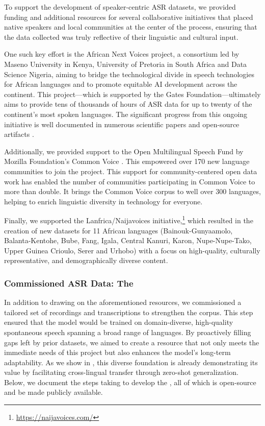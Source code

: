 \documentclass[]{fairmeta}
\begin{document}
To support the development of speaker-centric ASR datasets, we provided funding and additional resources for several collaborative initiatives that placed native speakers and local communities at the center of the process, ensuring that the data collected was truly reflective of their linguistic and cultural input.

One such key effort is the African Next Voices project, a consortium led by Maseno University in Kenya, University of Pretoria in South Africa and Data Science Nigeria, aiming to bridge the technological divide in speech technologies for African languages and to promote equitable AI development across the continent.  This project—which is supported by the Gates Foundation—ultimately aims to provide tens of thousands of hours of ASR data for up to twenty of the continent's most spoken languages. The significant progress from this ongoing initiative is well documented in numerous scientific papers and open-source artifacts \citep{anv-za,anv-ke,anv-et-amh,anv-et-sid,anv-et-wal,anv-et-tig,anv-et-orm,anv-kin,anv-swh}.

Additionally, we provided support to the Open Multilingual Speech Fund by Mozilla Foundation's Common Voice \citep{ardila2020common}. This empowered over 170 new language communities to join the project. This support for community-centered open data work has enabled the number of communities participating in Common Voice to more than double. It brings the Common Voice corpus to well over 300 languages, helping to enrich linguistic diversity in technology for everyone.

Finally, we supported the Lanfrica/Naijavoices initiative,\footnote{\url{https://naijavoices.com/}} which resulted in the creation of new datasets for 11 African languages (Bainouk-Gunyaamolo, Balanta-Kentohe, Bube, Fang, Igala, Central Kanuri, Karon, Nupe-Nupe-Tako, Upper Guinea Crioulo, Serer and Urhobo) with a focus on high-quality, culturally representative, and demographically diverse content.

\subsubsection{Commissioned ASR Data: The \vendorcorpus}
\label{sec:vendor_corpus_desc}

In addition to drawing on the aforementioned resources, we commissioned a tailored set of recordings and transcriptions to strengthen the corpus. This step ensured that the model would be trained on domain-diverse, high-quality spontaneous speech spanning a broad range of languages. By proactively filling gaps left by prior datasets, we aimed to create a resource that not only meets the immediate needs of this project but also enhances the model’s long-term adaptability. As we show in , this diverse foundation is already demonstrating its value by facilitating cross-lingual transfer through zero-shot generalization. Below, we document the steps taking to develop the \vendorcorpus, all of which is open-source and be made publicly available.
\end{document}
